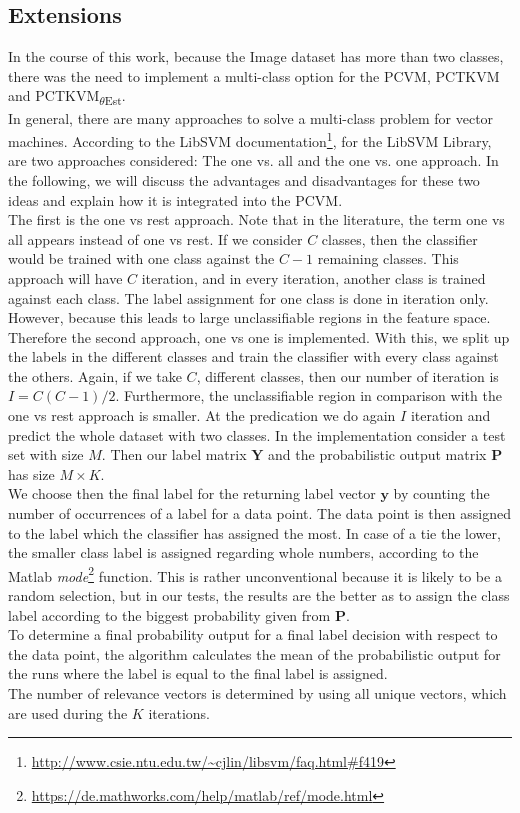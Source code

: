 \subsection{Extensions}\label{InSubSecExt}
In the course of this work, because the Image dataset has more than two classes, there was the need to implement a multi-class option for the \acs{PCVM}, \acs{PCTKVM} and \acs{PCTKVM}\textsubscript{$\theta$Est}.\\
In general, there are many approaches to solve a multi-class problem for vector machines.\cite[p. 113]{Abe.2010}
According to the LibSVM documentation\footnote{\url{http://www.csie.ntu.edu.tw/~cjlin/libsvm/faq.html\#f419}}, for the LibSVM Library, are two approaches considered: The one vs. all and the one vs. one approach.
In the following, we will discuss the advantages and disadvantages for these two ideas and explain how it is integrated into the \acs{PCVM}.\\
The first is the one vs rest approach.
Note that in the literature, the term one vs all appears instead of one vs rest.
If we consider $C$ classes, then the classifier would be trained with one class against the $C-1$ remaining classes.
This approach will have $C$ iteration, and in every iteration, another class is trained against each class.
The label assignment for one class is done in iteration only.
However, because this leads to large unclassifiable regions in the feature space.\cite[p. 114-116]{Abe.2010}\newline
Therefore the second approach, one vs one is implemented.
With this, we split up the labels in the different classes and train the classifier with every class against the others.
Again, if we take $C$, different classes, then our number of iteration is $I=C(C-1)/2$.
Furthermore, the unclassifiable region in comparison with the one vs rest approach is smaller.
At the predication we do again $I$ iteration and predict the whole dataset with two classes.\cite[p. 127-128]{Abe.2010}\newline
In the implementation consider a test set with size $M$.
Then our label matrix $\mathbf{Y}$ and the probabilistic output matrix $\mathbf{P}$ has size $M\times K$.\\
We choose then the final label for the returning label vector $\mathbf{y}$ by counting the number of occurrences of a label for a data point.
The data point is then assigned to the label which the classifier has assigned the most.
In case of a tie the lower, the smaller class label is assigned regarding whole numbers, according to the Matlab \textit{mode}\footnote{\url{https://de.mathworks.com/help/matlab/ref/mode.html}} function.
This is rather unconventional because it is likely to be a random selection, but in our tests, the results are the better as to assign the class label according to the biggest probability given from $\mathbf{P}$.\\
To determine a final probability output for a final label decision with respect to the data point, the algorithm calculates the mean of the probabilistic output for the runs where the label is equal to the final label is assigned.\\
The number of relevance vectors is determined by using all unique vectors, which are used during the $K$ iterations.

